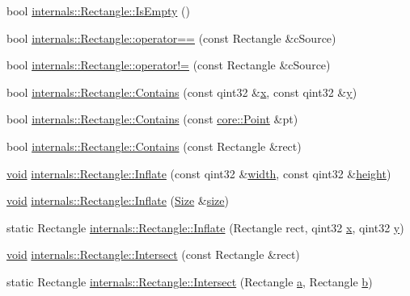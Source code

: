 \begin{DoxyCompactItemize}
bool \hyperlink{group___o_p_map_widget_ga62166310290103c5ae2f9fa8f2897108}{internals\-::\-Rectangle\-::\-Is\-Empty} ()
\item 
bool \hyperlink{group___o_p_map_widget_ga7035d0d861ec954d00fbfac5b0294105}{internals\-::\-Rectangle\-::operator==} (const Rectangle \&c\-Source)
\item 
bool \hyperlink{group___o_p_map_widget_ga646c7f23cab3711b80ef2a20056acdf0}{internals\-::\-Rectangle\-::operator!=} (const Rectangle \&c\-Source)
\item 
bool \hyperlink{group___o_p_map_widget_ga9a50cb554ff687d93a14da4f11d11bd1}{internals\-::\-Rectangle\-::\-Contains} (const qint32 \&\hyperlink{glext_8h_a1db9d104e3c2128177f26aff7b46982f}{x}, const qint32 \&\hyperlink{glext_8h_a42315f3ed8fff752bb47fd782309fcfc}{y})
\item 
bool \hyperlink{group___o_p_map_widget_gae21b00316ef3c6fc871a429a41261624}{internals\-::\-Rectangle\-::\-Contains} (const \hyperlink{structcore_1_1_point}{core\-::\-Point} \&pt)
\item 
bool \hyperlink{group___o_p_map_widget_gaaaaf9a5129b7af2409ad9a9e54698206}{internals\-::\-Rectangle\-::\-Contains} (const Rectangle \&rect)
\item 
\hyperlink{group___u_a_v_objects_plugin_ga444cf2ff3f0ecbe028adce838d373f5c}{void} \hyperlink{group___o_p_map_widget_ga75ec4589acf2aef1446a948b34b40cb9}{internals\-::\-Rectangle\-::\-Inflate} (const qint32 \&\hyperlink{glext_8h_a76aaa5c50746272e7d2de9aece921757}{width}, const qint32 \&\hyperlink{glext_8h_ae23e72c69f79d0aa647aa7929ef3f232}{height})
\item 
\hyperlink{group___u_a_v_objects_plugin_ga444cf2ff3f0ecbe028adce838d373f5c}{void} \hyperlink{group___o_p_map_widget_ga60b97161857418ee4ec8a2def48176e8}{internals\-::\-Rectangle\-::\-Inflate} (\hyperlink{structcore_1_1_size}{Size} \&\hyperlink{glext_8h_a014d89bd76f74ef3a29c8f04b473eb76}{size})
\item 
static Rectangle \hyperlink{group___o_p_map_widget_ga2968ca81b2ca433a710253f3c6168d36}{internals\-::\-Rectangle\-::\-Inflate} (Rectangle rect, qint32 \hyperlink{glext_8h_a1db9d104e3c2128177f26aff7b46982f}{x}, qint32 \hyperlink{glext_8h_a42315f3ed8fff752bb47fd782309fcfc}{y})
\item 
\hyperlink{group___u_a_v_objects_plugin_ga444cf2ff3f0ecbe028adce838d373f5c}{void} \hyperlink{group___o_p_map_widget_ga1eacc8faeb8cf4c202dc6eb3a2cd7482}{internals\-::\-Rectangle\-::\-Intersect} (const Rectangle \&rect)
\item 
static Rectangle \hyperlink{group___o_p_map_widget_ga6d1eb93d1aabfc6ef4c65cf4e81ea6c2}{internals\-::\-Rectangle\-::\-Intersect} (Rectangle \hyperlink{glext_8h_ac8729153468b5dcf13f971b21d84d4e5}{a}, Rectangle \hyperlink{glext_8h_a6eba317e3cf44d6d26c04a5a8f197dcb}{b})

\end{DoxyCompactItemize}
